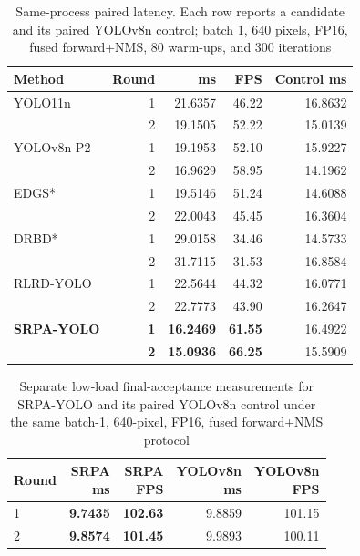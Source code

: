 \begin{table}[!t]
\caption{Same-process paired latency. Each row reports a candidate and its paired YOLOv8n control; batch 1, 640 pixels, FP16, fused forward+NMS, 80 warm-ups, and 300 iterations\label{tab:latency}}
\centering\srpatablesetup
\begin{tabular}{@{}lrrrr@{}}
\toprule
Method & Round & ms & FPS & Control ms\\
\midrule
YOLO11n & 1 & 21.6357 & 46.22 & 16.8632\\
 & 2 & 19.1505 & 52.22 & 15.0139\\
YOLOv8n-P2 & 1 & 19.1953 & 52.10 & 15.9227\\
 & 2 & 16.9629 & 58.95 & 14.1962\\
EDGS* & 1 & 19.5146 & 51.24 & 14.6088\\
 & 2 & 22.0043 & 45.45 & 16.3604\\
DRBD* & 1 & 29.0158 & 34.46 & 14.5733\\
 & 2 & 31.7115 & 31.53 & 16.8584\\
RLRD-YOLO & 1 & 22.5644 & 44.32 & 16.0771\\
 & 2 & 22.7773 & 43.90 & 16.2647\\
\textbf{SRPA-YOLO} & \textbf{1} & \textbf{16.2469} & \textbf{61.55} & 16.4922\\
 & \textbf{2} & \textbf{15.0936} & \textbf{66.25} & 15.5909\\
\bottomrule
\end{tabular}
\end{table}

\begin{table}[!t]
\caption{Separate low-load final-acceptance measurements for SRPA-YOLO and its paired YOLOv8n control under the same batch-1, 640-pixel, FP16, fused forward+NMS protocol\label{tab:cleanlat}}
\centering\srpatablesetup
\begin{tabular}{@{}lrrrr@{}}
\toprule
Round & \shortstack{SRPA\\ms} & \shortstack{SRPA\\FPS} & \shortstack{YOLOv8n\\ms} & \shortstack{YOLOv8n\\FPS}\\
\midrule
1 & \textbf{9.7435} & \textbf{102.63} & 9.8859 & 101.15\\
2 & \textbf{9.8574} & \textbf{101.45} & 9.9893 & 100.11\\
\bottomrule
\end{tabular}
\end{table}
